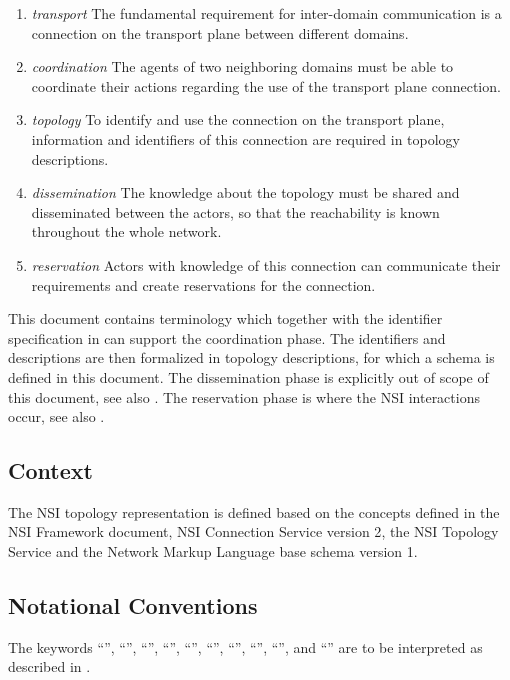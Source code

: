 \documentclass[12pt]{article}  %
\begin{document}
\begin{enumerate}
    \item \emph{transport} The fundamental requirement for inter-domain communication is a connection on the transport plane between different domains.
    \item \emph{coordination} The agents of two neighboring domains must be able to coordinate their actions regarding the use of the transport plane connection.
    \item \emph{topology} To identify and use the connection on the transport plane, information and identifiers of this connection are required in topology descriptions.
    \item \emph{dissemination} The knowledge about the topology must be shared and disseminated between the actors, so that the reachability is known throughout the whole network.
    \item \emph{reservation} Actors with knowledge of this connection can communicate their requirements and create reservations for the connection.
\end{enumerate}

This document contains terminology which together with the identifier specification in \cite{GFD.202} can support the coordination phase. The identifiers and descriptions are then formalized in topology descriptions, for which a schema is defined in this document. The dissemination phase is explicitly out of scope of this document, see also \cite{gfd-nsi-topo-serv}. The reservation phase is where the NSI interactions occur, see also \cite{GFD.173}.


\subsection{Context} %
\label{sub:context}

The NSI topology representation is defined based on the concepts defined in the NSI Framework document\cite{GFD.173}, NSI Connection Service version 2\cite{gfd-nsi-connection}, the NSI Topology Service\cite{gfd-nsi-topo-serv} and the Network Markup Language base schema version 1\cite{GFD.206}.

\subsection{Notational Conventions}%
\label{sec:rfc2119}

The keywords “\MUST{}”, “\MUSTNOT{}”, “\REQUIRED{}”, “\SHALL{}”, “\SHALLNOT{}”, 
“\SHOULD{}”, “\SHOULDNOT{}”, “\RECOMMENDED{}”, “\MAY{}”,  and “\OPTIONAL{}” are 
to be interpreted as described in \cite{rfc2119}.
\end{document}
